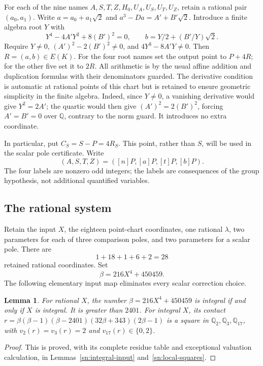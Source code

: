 \documentclass[11pt,a4paper]{article}
\newtheorem{lemma}[theorem]{Lemma}
\theoremstyle{definition}
\theoremstyle{remark}
\begin{document}
For each of the nine names $A,S,T,Z,H_0,U_A,U_S,U_T,U_Z$, retain a
rational pair $(a_0,a_1)$.  Write $a=a_0+a_1\sqrt2$ and
$a^3-Da=A'+B'\sqrt2$.  Introduce a finite algebra root $Y$ with
\[
 Y^4-4A'Y^2+8(B')^2=0,\qquad
 b=Y/2+(B'/Y)\sqrt2.
\]
Require $Y\ne0$, $(A')^2-2(B')^2\ne0$, and
$4Y^3-8A'Y\ne0$.  Then $R=(a,b)\in E(K)$.
For the four root names set the output point to $P+4R$; for the other
five set it to $2R$.  All arithmetic is by the usual affine addition
and duplication formulas with their denominators guarded.  The
derivative condition is automatic at rational points of this chart
but is retained to ensure geometric simplicity in the finite algebra.
Indeed, since $Y\ne0$, a vanishing derivative would give $Y^2=2A'$;
the quartic would then give $(A')^2=2(B')^2$, forcing $A'=B'=0$
over $\mathbb Q$, contrary to the norm guard.
It introduces no extra coordinate.

In particular, put $C_S=S-P=4R_S$.  This point, rather than $S$,
will be used in the scalar pole certificate.  Write
\[
 (A,S,T,Z)=([n]P,[a]P,[t]P,[b]P).
\]
The four labels are nonzero odd integers; the labels are consequences
of the group hypothesis, not additional quantified variables.

\subsection{The rational system}

Retain the input $X$, the eighteen point-chart coordinates, one
rational $\lambda$, two parameters for each of three comparison poles,
and two parameters for a scalar pole.  There are
\[
                            1+18+1+6+2=28
\]
retained rational coordinates.  Set
\[
                 \beta=216X^4+450459.
\]
The following elementary input map eliminates every scalar correction
choice.

\begin{lemma}\label{lem:u29-input-map}
For rational $X$, the number $\beta=216X^4+450459$ is integral
if and only if $X$ is integral. It is greater than $2401$.
For integral $X$, its contact
$r=\beta(\beta-1)(\beta-2401)(32\beta+343)(2\beta-1)$
is a square in $\mathbb Q_2,\mathbb Q_3,\mathbb Q_{17}$,
with $v_2(r)=v_3(r)=2$ and $v_{17}(r)\in\{0,2\}$.
\end{lemma}
\begin{proof}
This is proved, with its complete residue table and exceptional
valuation calculation, in Lemmas~\ref{sn:integral-input}
and~\ref{sn:local-squares}.
\end{proof}
\end{document}
